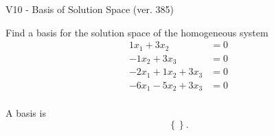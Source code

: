 \begin{exercise}
  \begin{exerciseTitle}V10 - Basis of Solution Space (ver. 385)\end{exerciseTitle}
  \begin{exerciseStatement}
    Find a basis for the solution space of the homogeneous system 
\begin{align*}
 1 x_ 1 + 3 x_ 2 &= 0  \\ 
  -1 x_ 2 + 3 x_ 3 &= 0  \\ 
  -2 x_ 1 + 1 x_ 2 + 3 x_ 3 &= 0  \\ 
  -6 x_ 1 -5 x_ 2 + 3 x_ 3 &= 0  \\ 
 \end{align*}


 
  \end{exerciseStatement}

  \begin{exerciseAnswer}
   A basis is   
\[\left\{\right\}.\]

  


  \end{exerciseAnswer}
\end{exercise}